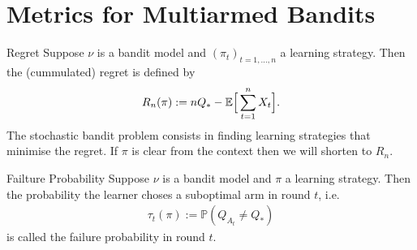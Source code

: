 \section{Metrics for Multiarmed Bandits}

\begin{frame}
    \begin{ldef}{Regret}
            Suppose $\nu$ is a bandit model and $(\pi_t)_{t=1,\dots,n}$ a learning strategy. Then the (cummulated) regret is defined by 
            \begin{align*}
                R_n(\pi):=nQ_*-\mathbb{E}\Big[\sum_{t=1}^n X_t\Big].
            \end{align*}
            The stochastic bandit problem consists in finding learning strategies that minimise the regret. If $\pi$ is clear from the context then we will shorten to $R_n$.
    \end{ldef}
\end{frame}
\begin{frame}
    \begin{ldef}{Failture Probability}
        Suppose $\nu$ is a bandit model and $\pi$ a learning strategy. Then the probability the learner choses a suboptimal arm in round $t$, i.e.
        \begin{align*}
            \tau_t(\pi):=\mathbb{P}(Q_{A_t}\neq Q_*)
        \end{align*}
        is called the failure probability in round $t$.
    \end{ldef}
\end{frame}